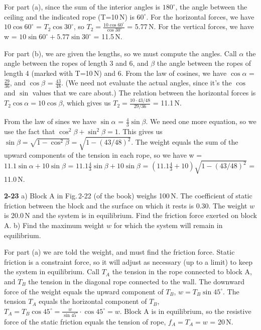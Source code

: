 \documentclass{amsart}
\begin{document}
For part (a), since the sum of the interior angles is $180^\circ$,
the angle between the ceiling and the indicated rope (T=10\,N) is $60^\circ$.
For the horizontal forces, we have $10 \cos 60^\circ$ = $T_2 \cos 30^\circ$,
so $T_2 = \frac{10 \cos 60^\circ}{\cos 30^\circ}$ = 5.77\,N.
For the vertical forces, we have w = $10 \sin 60^\circ + 5.77 \sin 30^\circ$ = 11.5\,N.

For part (b), we are given the lengths, so we must compute the angles.
Call $\alpha$ the angle between the ropes of length 3 and 6, and $\beta$ the angle
between the ropes of length 4 (marked with T=10\,N) and 6.
From the law of cosines, we have $\cos \alpha$ = $\frac{29}{36}$,
and $\cos \beta$ = $\frac{43}{48}$.  (We need not evaluate the actual angles,
since it's the $\cos$ and $\sin$ values that we care about.)
The relation between the horizontal forces is $T_2 \cos \alpha = 10 \cos \beta$,
which gives us $T_2 = \frac{10 \cdot 43/48}{29/36}$ = 11.1\,N.

From the law of sines we have $\sin \alpha$ = $\frac{4}{3} \sin \beta$.
We need one more equation, so we use the fact that $\cos^2 \beta + \sin^2 \beta = 1$.
This gives us $\sin \beta = \sqrt{1-\cos^2 \beta} = \sqrt{1-(43/48)^2}$.
The weight equals the sum of the upward components of the tension in each rope,
so we have w = $11.1 \sin \alpha + 10 \sin \beta$ = $11.1 \frac{4}{3} \sin \beta + 10 \sin \beta$ =
$(11.1 \frac{4}{3} + 10) \sqrt{1-(43/48)^2}$ = 11.0\,N.

\vspace{\baselineskip}
\noindent
\textbf{2-23}\newline
a) Block A in Fig.\,2-22 (of the book) weighs 100\,N.
The coefficient of static friction between the block and the surface on which it rests
is 0.30.  The weight $w$ is 20.0\,N and the system is in equilibrium.
Find the friction force exerted on block A.\newline
b) Find the maximum weight $w$ for which the system will remain in equilibrium.

For part (a) we are told the weight, and must find the friction force.
Static friction is a constraint force, so it will adjust as necessary (up to a limit)
to keep the system in equilibrium.
Call $T_A$ the tension in the rope connected to block A,
and $T_B$ the tension in the diagonal rope connected to the wall.
The downward force of the weight equals the upward component of $T_B$,
$w = T_B \sin 45^\circ$.  The tension $T_A$ equals the horizontal component
of $T_B$, $T_A = T_B \cos 45^\circ = \frac{w}{\sin 45^\circ} \cdot \cos 45^\circ = w$.
Block A is in equilibrium, so the resistive force of the static friction equals the tension
of rope, $f_A = T_A = w$ = 20\,N.
\end{document}
